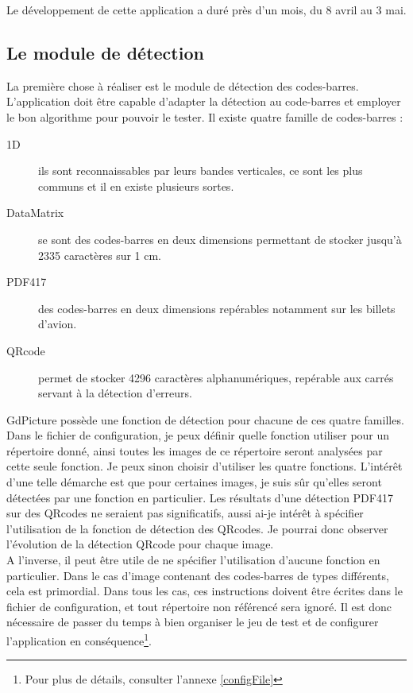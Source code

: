 Le développement de cette application a duré près d'un mois, du 8 avril au 3 mai.

\subsection{Le module de détection}

La première chose à réaliser est le module de détection des codes-barres. L'application doit être capable d'adapter la détection au code-barres et employer le bon algorithme pour pouvoir le tester.
Il existe quatre famille de codes-barres :

\begin{description}
 \item[1D] ils sont reconnaissables par leurs bandes verticales, ce sont les plus communs et il en existe plusieurs sortes.
 \item[DataMatrix] se sont des codes-barres en deux dimensions permettant de stocker jusqu'à 2335 caractères sur 1 cm.
 \item[PDF417] des codes-barres en deux dimensions repérables notamment sur les billets d'avion.
 \item[QRcode] permet de stocker 4296 caractères alphanumériques, repérable aux carrés servant à la détection d'erreurs.
\end{description}

GdPicture possède une fonction de détection pour chacune de ces quatre familles. Dans le fichier de configuration, je peux définir quelle fonction utiliser pour un répertoire donné, ainsi toutes les images de ce répertoire seront analysées par cette seule fonction. Je peux sinon choisir d'utiliser les quatre fonctions. L'intérêt d'une telle démarche est que pour certaines images, je suis sûr qu'elles seront détectées par une fonction en particulier. Les résultats d'une détection PDF417 sur des QRcodes ne seraient pas significatifs, aussi ai-je intérêt à spécifier l'utilisation de la fonction de détection des QRcodes. Je pourrai donc observer l'évolution de la détection QRcode pour chaque image.\\
A l'inverse, il peut être utile de ne spécifier l'utilisation d'aucune fonction en particulier. Dans le cas d'image contenant des codes-barres de types différents, cela est primordial. Dans tous les cas, ces instructions doivent être écrites dans le fichier de configuration, et tout répertoire non référencé sera ignoré. Il est donc nécessaire de passer du temps à bien organiser le jeu de test et de configurer l'application en conséquence\footnote{Pour plus de détails, consulter l'annexe \ref{configFile}}.

